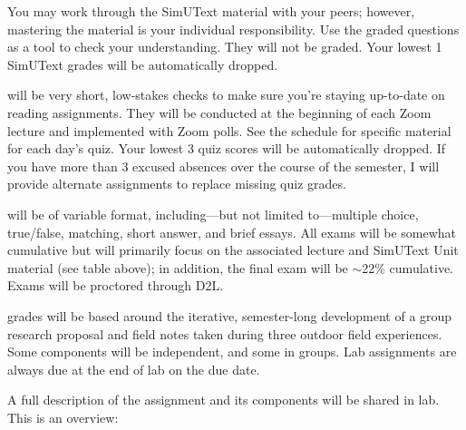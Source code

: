 \documentclass{tufte-handout}
\begin{document}
\begin{fullwidth}

You may work through the SimUText material with your peers; however, mastering the material is your individual responsibility. Use the graded questions as a tool to check your understanding. They will not be graded. Your lowest 1 SimUText grades will be automatically dropped.

 will be very short, low-stakes checks to make sure you're staying up-to-date on reading assignments. They will be conducted at the beginning of each Zoom lecture and implemented with Zoom polls. See the schedule for specific material for each day's quiz. Your lowest 3 quiz scores will be automatically dropped. If you have more than 3 excused absences over the course of the semester, I will provide alternate assignments to replace missing quiz grades.

 will be of variable format, including---but not limited to---multiple choice, true/false, matching, short answer, and brief essays. All exams will be somewhat cumulative but will primarily focus on the associated lecture and SimUText Unit material (see table above); in addition, the final exam will be $\sim$22\% cumulative. Exams will be proctored through D2L.



 grades will be based around the iterative, semester-long development of a group research proposal and field notes taken during three outdoor field experiences.  Some components will be independent, and some in groups. Lab assignments are always due at the end of lab on the due date. 

A full description of the assignment and its components will be shared in lab. This is an overview:


\end{fullwidth}
\end{document}
